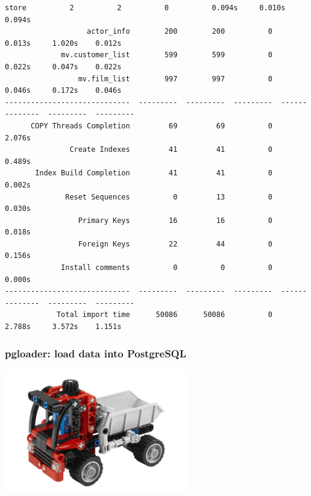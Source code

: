 \documentclass{beamer}
\begin{document}
\begin{frame}[fragile]
\begin{Verbatim}[fontsize=\tiny]
                        store          2          2          0          0.094s     0.010s    0.094s
                   actor_info        200        200          0          0.013s     1.020s    0.012s
             mv.customer_list        599        599          0          0.022s     0.047s    0.022s
                 mv.film_list        997        997          0          0.046s     0.172s    0.046s
-----------------------------  ---------  ---------  ---------  --------------  ---------  ---------
      COPY Threads Completion         69         69          0          2.076s                     
               Create Indexes         41         41          0          0.489s                     
       Index Build Completion         41         41          0          0.002s                     
              Reset Sequences          0         13          0          0.030s                     
                 Primary Keys         16         16          0          0.018s                     
                 Foreign Keys         22         44          0          0.156s                     
             Install comments          0          0          0          0.000s                     
-----------------------------  ---------  ---------  ---------  --------------  ---------  ---------
            Total import time      50086      50086          0          2.788s     3.572s    1.151s
\end{Verbatim}
\end{frame}

\begin{frame}
  \frametitle{pgloader: load data into PostgreSQL}


  \begin{center}
    \includegraphics[height=2.1in]{pgloader.jpg}
  \end{center}
\end{frame}
\end{document}
